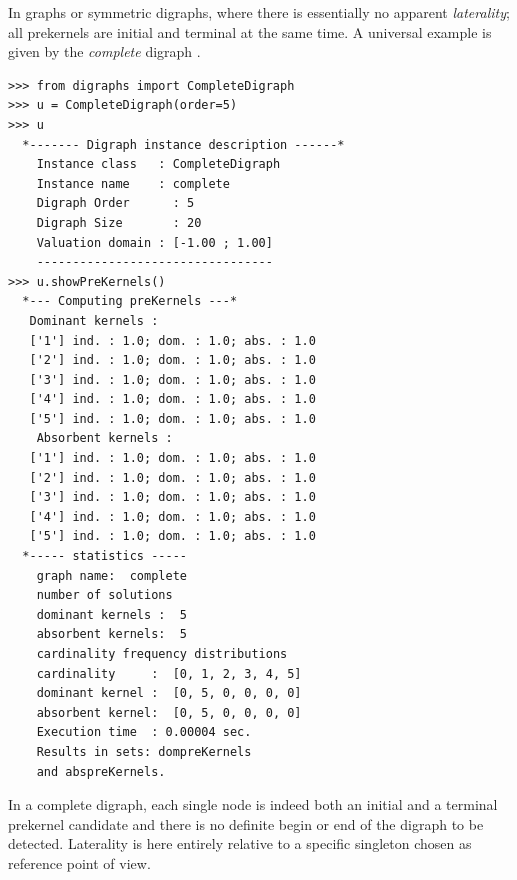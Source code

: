 In graphs or symmetric digraphs, where there is essentially no apparent \emph{laterality}; all prekernels are initial and terminal at the same time. A universal example is given by the \emph{complete} digraph .
\begin{lstlisting}[caption={The prekernels of a complete digraph},label=list:17.3]
>>> from digraphs import CompleteDigraph
>>> u = CompleteDigraph(order=5)
>>> u
  *------- Digraph instance description ------*
    Instance class   : CompleteDigraph
    Instance name    : complete
    Digraph Order      : 5
    Digraph Size       : 20
    Valuation domain : [-1.00 ; 1.00]
    ---------------------------------
>>> u.showPreKernels()
  *--- Computing preKernels ---*
   Dominant kernels :
   ['1'] ind. : 1.0; dom. : 1.0; abs. : 1.0
   ['2'] ind. : 1.0; dom. : 1.0; abs. : 1.0
   ['3'] ind. : 1.0; dom. : 1.0; abs. : 1.0
   ['4'] ind. : 1.0; dom. : 1.0; abs. : 1.0
   ['5'] ind. : 1.0; dom. : 1.0; abs. : 1.0
    Absorbent kernels :
   ['1'] ind. : 1.0; dom. : 1.0; abs. : 1.0
   ['2'] ind. : 1.0; dom. : 1.0; abs. : 1.0
   ['3'] ind. : 1.0; dom. : 1.0; abs. : 1.0
   ['4'] ind. : 1.0; dom. : 1.0; abs. : 1.0
   ['5'] ind. : 1.0; dom. : 1.0; abs. : 1.0
  *----- statistics -----
    graph name:  complete
    number of solutions
    dominant kernels :  5
    absorbent kernels:  5
    cardinality frequency distributions
    cardinality     :  [0, 1, 2, 3, 4, 5]
    dominant kernel :  [0, 5, 0, 0, 0, 0]
    absorbent kernel:  [0, 5, 0, 0, 0, 0]
    Execution time  : 0.00004 sec.
    Results in sets: dompreKernels
    and abspreKernels.
\end{lstlisting}
In a complete digraph, each single node is indeed both an initial and a terminal prekernel candidate and there is no definite begin or end of the digraph to be detected. Laterality is here entirely relative to a specific singleton chosen as reference point of view.

